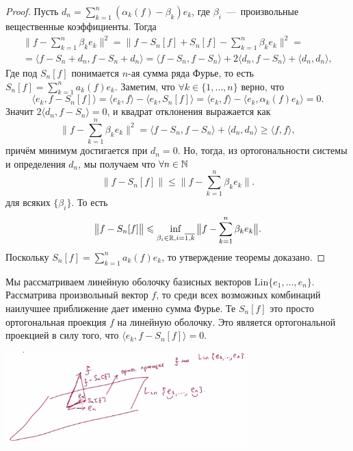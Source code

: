 \begin{proof}
    Пусть $d_n = \sum\limits_{k = 1}^n (\alpha_k(f) - \beta_k) e_k$, где $\beta_i$~---~произвольные вещественные коэффициенты.
    Тогда
    \begin{multline*}
        \big\|f - \sum\limits_{k = 1}^n \beta_{k}e_k\big\|^2 = \big\|f - S_n[f] + S_n[f] - \sum\limits_{k = 1}^n \beta_k e_k\big\|^2 = \\ =
        \langle f - S_n + d_n, f - S_n + d_n \rangle = \langle f - S_n, f - S_n \rangle + 2 \langle d_n, f - S_n \rangle + \langle d_n, d_n \rangle,
    \end{multline*}
    Где под $S_n[f]$ понимается $n$-ая сумма ряда Фурье, то есть $S_n[f] = \sum\limits_{k = 1}^n a_k(f)e_k$.
    Заметим, что $\forall k \in \{1, \ldots, n\}$ верно, что
    \[
        \langle e_k, f - S_n[f] \rangle = \langle e_k, f \rangle - \langle e_k, S_n[f] \rangle = \langle e_k, f \rangle - \langle e_k, \alpha_k(f)e_k \rangle = 0.
    \]
    Значит $2\langle d_n, f - S_n \rangle = 0$, и квадрат отклонения выражается как
    \begin{equation*}
        \big\|f - \sum\limits_{k = 1}^n \beta_k e_k\big\|^2 = \langle f - S_n, f - S_n \rangle+ \langle d_n, d_n \rangle \geq \langle f, f \rangle,
    \end{equation*}
    причём минимум достигается при $d_n = 0$.
    Но, тогда, из ортогональности системы и определения $d_n$, мы получаем что $\forall n \in \mathbb{N}$
    \begin{equation*}
        \big\|f - S_n[f]\big\| \leq \big\|f - \sum\limits_{k = 1}^n \beta_k e_k\big\|.
    \end{equation*}
    для всяких $\{\beta_i\}$. То есть
    \[
        \big\|f - S_n[f]\big\| \leqslant \inf\limits_{\beta_i \in \mathbb{R}, i = \overline{1, k}} \big\|f - \sum\limits_{k = 1}^n \beta_{k}e_k\big\|.
    \]
    Поскольку $S_n[f] = \sum\limits_{k = 1}^n a_k(f)e_k$, то утверждение теоремы доказано.
\end{proof}
\begin{note}
    Мы рассматриваем линейную оболочку базисных векторов $\text{Lin}\{e_1,\dots,e_n\}$. Рассматрива произвольный вектор $f$, то среди всех возможных комбинаций наилучшее приближение дает именно сумма Фурье. Те $S_n[f]$ это просто ортогональная проекция $f$ на линейную оболочку. Это является ортогональной проекцией в силу того, что $ \langle e_k, f - S_n[f] \rangle = 0.$

    \begin{minipage}{\textwidth}
    \centering
    \includegraphics[width=0.7\textwidth]{Pictures/pic1.png} 
    \end{minipage}



\end{note}
